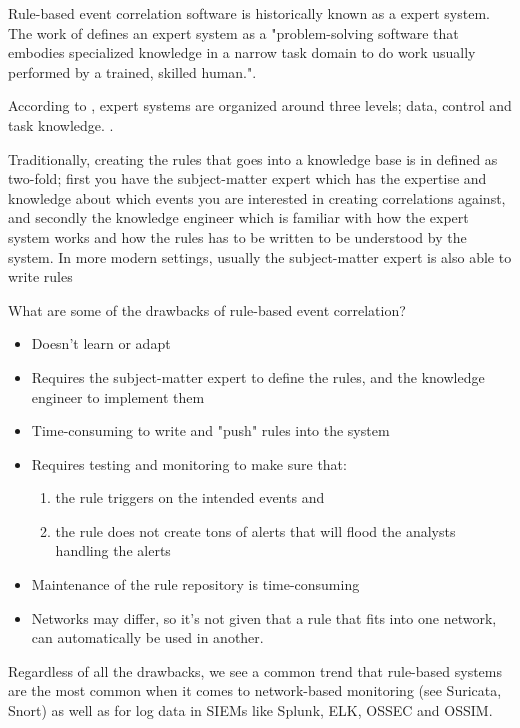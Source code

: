 Rule-based event correlation software is historically known as a expert system. The work of \textcite{cronk_1988} defines an expert system as a "problem-solving software that embodies specialized knowledge in a narrow task domain to do work usually performed by a trained, skilled human.".

According to \textcite{cronk_1988}, expert systems are organized around three levels; data, control and task knowledge. .

Traditionally, creating the rules that goes into a knowledge base is in \textcite{cronk_1988} defined as two-fold; first you have the subject-matter expert which has the expertise and knowledge about which events you are interested in creating correlations against, and secondly the knowledge engineer which is familiar with how the expert system works and how the rules has to be written to be understood by the system.
In more modern settings, usually the subject-matter expert is also able to write rules

What are some of the drawbacks of rule-based event correlation?

\begin{itemize}
    \item Doesn't learn or adapt
    \item Requires the subject-matter expert to define the rules, and the knowledge engineer to implement them
    \item Time-consuming to write and "push" rules into the system
    \item Requires testing and monitoring to make sure that:
    \begin{enumerate}
        \item the rule triggers on the intended events and
        \item the rule does not create tons of alerts that will flood the analysts handling the alerts
    \end{enumerate} 
    \item Maintenance of the rule repository is time-consuming
    \item Networks may differ, so it's not given that a rule that fits into one network, can automatically be used in another.
\end{itemize}

Regardless of all the drawbacks, we see a common trend that rule-based systems are the most common when it comes to network-based monitoring (see Suricata, Snort) as well as for log data in SIEMs like Splunk, ELK, OSSEC and OSSIM.


